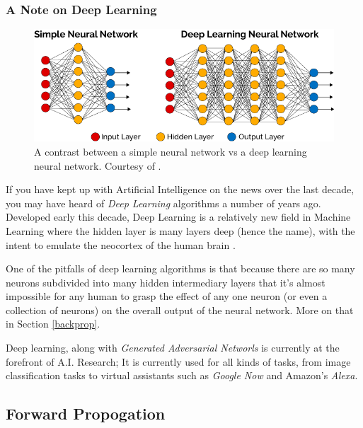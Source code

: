 \documentclass[12pt]{article}
\begin{document}
        \subsubsection{A Note on Deep Learning}
            
        \begin{figure}[h]
                \centering
                    \includegraphics[width=\textwidth]{DeepLearning-diagram.png}
                \caption{A contrast between a simple neural network vs a deep learning neural network. Courtesy of \textcite{vazquez17}. \label{deeplearningfig}}
            \end{figure}

            If you have kept up with Artificial Intelligence on the news over the last decade, you may have heard of \textit{Deep Learning} algorithms a number of years ago. Developed early this decade, Deep Learning is a relatively new field in Machine Learning where the hidden layer is many layers deep (hence the name), with the intent to emulate the neocortex of the human brain \textcite{Hof2013}.

            One of the pitfalls of deep learning algorithms is that because there are so many neurons subdivided into many hidden intermediary layers that it's almost impossible for any human to grasp the effect of any one neuron (or even a collection of neurons) on the overall output of the neural network. More on that in Section \ref{backprop}.

            Deep learning, along with \textit{Generated Adversarial Networls} is currently at the forefront of A.I. Research; It is currently used for all kinds of tasks, from image classification tasks to virtual assistants such as \textit{Google Now} and Amazon's \textit{Alexa}. \textcite{vazquez17}


 
    \subsection{Forward Propogation \label{foreprop}}
\end{document}
